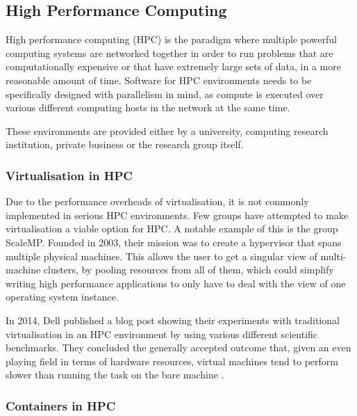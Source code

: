 

\subsection{High Performance Computing}

High performance computing (HPC) is the paradigm where multiple powerful computing systems are networked together in order to run problems that are computationally expensive or that have extremely large sets of data, in a more reasonable amount of time. Software for HPC environments needs to be specifically designed with parallelism in mind, as compute is executed over various different computing hosts in the network at the same time.

These environments are provided either by a university, computing research institution, private business or the research group itself.

\subsubsection{Virtualisation in HPC}

Due to the performance overheads of virtualisation, it is not commonly implemented in serious HPC environments. Few groups have attempted to make virtualisation a viable option for HPC. A notable example of this is the group ScaleMP. Founded in 2003, their mission was to create a hypervisor that spans multiple physical machines. This allows the user to get a singular view of multi-machine clusters, by pooling resources from all of them, which could simplify writing high performance applications to only have to deal with the view of one operating system instance.

In 2014, Dell published a blog post showing their experiments with traditional virtualisation in an HPC environment by using various different scientific benchmarks. They concluded the generally accepted outcome that, given an even playing field in terms of hardware resources, virtual machines tend to perform slower than running the task on the bare machine \parencite{dell_container_perf}.

\subsubsection{Containers in HPC}

